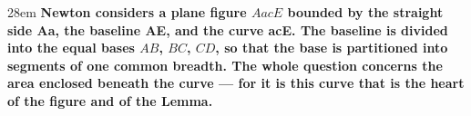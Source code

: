 \documentclass[border=4pt]{standalone}
\begin{document}
\begin{varwidth}{28em}
\large\bfseries
Newton considers a plane figure $AacE$ bounded by the straight side Aa,
the baseline AE, and the curve acE.
The baseline is divided into the equal bases $AB$, $BC$, $CD$, so that the base
is partitioned into segments of one common breadth.
The whole question concerns the area enclosed beneath the curve —
for it is this curve that is the heart of the figure and of the Lemma.
\end{varwidth}
\end{document}
